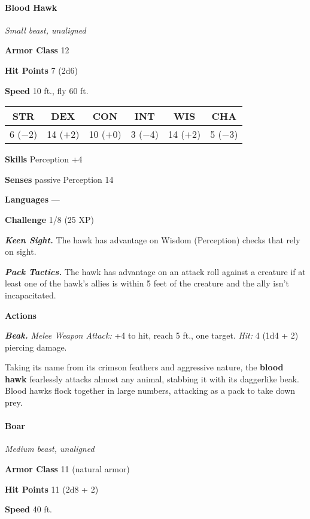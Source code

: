\documentclass[
]{article}
\begin{document}
\hypertarget{blood-hawk}{%
\paragraph{Blood Hawk}\label{blood-hawk}}

\emph{Small beast, unaligned}

\textbf{Armor Class} 12

\textbf{Hit Points} 7 (2d6)

\textbf{Speed} 10 ft., fly 60 ft.

\begin{longtable}[]{@{}cccccc@{}}
\toprule
STR & DEX & CON & INT & WIS & CHA\tabularnewline
\midrule
\endhead
6 (−2) & 14 (+2) & 10 (+0) & 3 (−4) & 14 (+2) & 5 (−3)\tabularnewline
\bottomrule
\end{longtable}

\textbf{Skills} Perception +4

\textbf{Senses} passive Perception 14

\textbf{Languages} ---

\textbf{Challenge} 1/8 (25 XP)

\emph{\textbf{Keen Sight.}} The hawk has advantage on Wisdom
(Perception) checks that rely on sight.

\emph{\textbf{Pack Tactics.}} The hawk has advantage on an attack roll
against a creature if at least one of the hawk's allies is within 5 feet
of the creature and the ally isn't incapacitated.

\textbf{Actions}

\emph{\textbf{Beak.}} \emph{Melee Weapon Attack:} +4 to hit, reach 5
ft., one target. \emph{Hit:} 4 (1d4 + 2) piercing damage.

Taking its name from its crimson feathers and aggressive nature, the
\textbf{blood hawk} fearlessly attacks almost any animal, stabbing it
with its daggerlike beak. Blood hawks flock together in large numbers,
attacking as a pack to take down prey.

\hypertarget{boar}{%
\paragraph{Boar}\label{boar}}

\emph{Medium beast, unaligned}

\textbf{Armor Class} 11 (natural armor)

\textbf{Hit Points} 11 (2d8 + 2)

\textbf{Speed} 40 ft.
\end{document}
